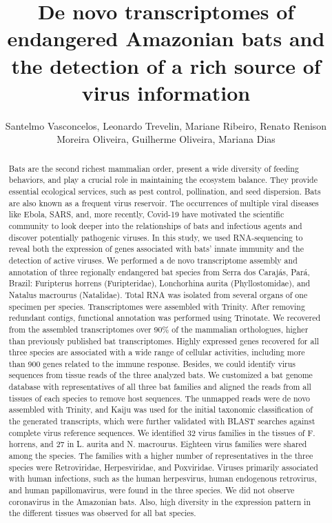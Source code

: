 \documentclass[twoside]{article}
\title{\vspace{-15mm}\fontsize{24pt}{10pt}\selectfont\textbf{ De novo transcriptomes of endangered Amazonian bats and the detection of a rich source of virus information }} %
\author{ Santelmo Vasconcelos,  Leonardo Trevelin,  Mariane Ribeiro,  Renato Renison Moreira Oliveira,  Guilherme Oliveira,  Mariana Dias }
\affil{ ITV - Instituto Tecnol\'ogico Vale,  UNIVERSIDADE FEDERAL DE MINAS GERAIS,  UFMG/ITV,  ITV - Instituto Tecnol\'ogico Vale }
\date{}
\begin{document}
  
  
  \maketitle %
  
  
  \thispagestyle{fancy} %
  
  
  \begin{abstract}
  Bats are the second richest mammalian order,  present a wide diversity of feeding behaviors,  and play a crucial role in maintaining the ecosystem balance. They provide essential ecological services,  such as pest control,  pollination,  and seed dispersion. Bats are also known as a frequent virus reservoir. The occurrences of multiple viral diseases like Ebola,  SARS,  and,  more recently,  Covid-19 have motivated the scientific community to look deeper into the relationships of bats and infectious agents and discover potentially pathogenic viruses. In this study,  we used RNA-sequencing to reveal both the expression of genes associated with bats' innate immunity and the detection of active viruses. We performed a de novo transcriptome assembly and annotation of three regionally endangered bat species from Serra dos Caraj\'as,  Par\'a,  Brazil: Furipterus horrens (Furipteridae),  Lonchorhina aurita (Phyllostomidae),  and Natalus macrourus (Natalidae). Total RNA was isolated from several organs of one specimen per species. Transcriptomes were assembled with Trinity. After removing redundant contigs,  functional annotation was performed using Trinotate. We recovered from the assembled transcriptomes over 90\% of the mammalian orthologues,  higher than previously published bat transcriptomes. Highly expressed genes recovered for all three species are associated with a wide range of cellular activities,  including more than 900 genes related to the immune response. Besides,  we could identify virus sequences from tissue reads of the three analyzed bats. We customized a bat genome database with representatives of all three bat families and aligned the reads from all tissues of each species to remove host sequences. The unmapped reads were de novo assembled with Trinity,  and Kaiju was used for the initial taxonomic classification of the generated transcripts,  which were further validated with BLAST searches against complete virus reference sequences. We identified 32 virus families in the tissues of F. horrens,  and 27 in L. aurita and N. macrourus. Eighteen virus families were shared among the species. The families with a higher number of representatives in the three species were Retroviridae,  Herpesviridae,  and Poxviridae. Viruses primarily associated with human infections,  such as the human herpesvirus,  human endogenous retrovirus,  and human papillomavirus,  were found in the three species. We did not observe coronavirus in the Amazonian bats. Also,  high diversity in the expression pattern in the different tissues was observed for all bat species.
  

\end{abstract}
\end{document}
